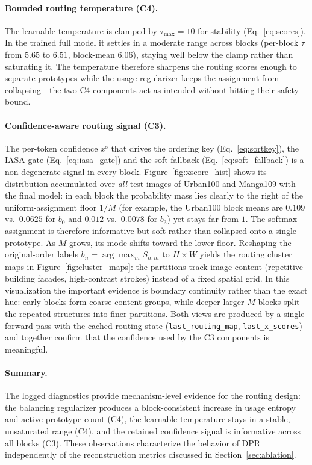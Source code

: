 \paragraph{Bounded routing temperature (C4).}
The learnable temperature is clamped by $\tau_{\max}{=}10$ for stability
(Eq.~\eqref{eq:scores}). In the trained full model it settles in a moderate range
across blocks (per-block $\tau$ from $5.65$ to $6.51$, block-mean $6.06$), staying
well below the clamp rather than saturating it. The temperature therefore sharpens
the routing scores enough to separate prototypes while the usage regularizer keeps
the assignment from collapsing---the two C4 components act as intended without
hitting their safety bound.

\paragraph{Confidence-aware routing signal (C3).}
The per-token confidence $x^{\mathrm{s}}$ that drives the ordering key
(Eq.~\eqref{eq:sortkey}), the IASA gate (Eq.~\eqref{eq:iasa_gate}) and the soft
fallback (Eq.~\eqref{eq:soft_fallback}) is a non-degenerate signal in every block.
Figure~\ref{fig:xscore_hist} shows its distribution accumulated over \emph{all} test
images of Urban100 and Manga109 with the final model: in each block the probability
mass lies clearly to the right of the uniform-assignment floor $1/M$ (for example, the
Urban100 block means are $0.109$ vs.\ $0.0625$ for $b_0$ and $0.012$ vs.\
$0.0078$ for $b_3$) yet stays far from $1$. The
softmax assignment is therefore informative but soft rather than collapsed onto a
single prototype. As $M$ grows, its mode shifts toward the lower floor. Reshaping
the original-order labels $b_n=\arg\max_m S_{n,m}$ to $H\times W$ yields the routing
cluster maps in Figure~\ref{fig:cluster_maps}: the partitions track image content
(repetitive building facades, high-contrast strokes) instead of a fixed spatial
grid. In this visualization the important evidence is boundary continuity rather
than the exact hue: early blocks form coarse content groups, while deeper
larger-$M$ blocks split the repeated structures into finer partitions. Both views
are produced by a single forward pass with the cached routing state
(\texttt{last\_routing\_map}, \texttt{last\_x\_scores}) and together confirm that
the confidence used by the C3 components is meaningful.

\paragraph{Summary.}
The logged diagnostics provide mechanism-level evidence for the routing design:
the balancing regularizer produces a block-consistent increase in usage
entropy and active-prototype count (C4), the learnable temperature stays in a
stable, unsaturated range (C4), and the retained confidence signal is informative
across all blocks (C3). These observations characterize the behavior of DPR
independently of the reconstruction metrics discussed in
Section~\ref{sec:ablation}.
